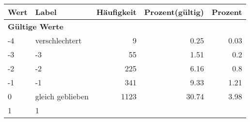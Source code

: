      \begin{longtable}{lXrrr}
     \toprule
     \textbf{Wert} & \textbf{Label} & \textbf{Häufigkeit} & \textbf{Prozent(gültig)} & \textbf{Prozent} \\
     \endhead
     \midrule
     \multicolumn{5}{l}{\textbf{Gültige Werte}}\\

     -4 &
     \multicolumn{1}{X}{ verschlechtert   } &


       \num{9} &
       \num[round-mode=places,round-precision=2]{0,25} &
         \num[round-mode=places,round-precision=2]{0,03} \\

     -3 &
     \multicolumn{1}{X}{ -3   } &


       \num{55} &
       \num[round-mode=places,round-precision=2]{1,51} &
         \num[round-mode=places,round-precision=2]{0,2} \\

     -2 &
     \multicolumn{1}{X}{ -2   } &


       \num{225} &
       \num[round-mode=places,round-precision=2]{6,16} &
         \num[round-mode=places,round-precision=2]{0,8} \\

     -1 &
     \multicolumn{1}{X}{ -1   } &


       \num{341} &
       \num[round-mode=places,round-precision=2]{9,33} &
         \num[round-mode=places,round-precision=2]{1,21} \\

     0 &
     \multicolumn{1}{X}{ gleich geblieben   } &


       \num{1123} &
       \num[round-mode=places,round-precision=2]{30,74} &
         \num[round-mode=places,round-precision=2]{3,98} \\

     1 &
     \multicolumn{1}{X}{ 1   } &



\end{longtable}
